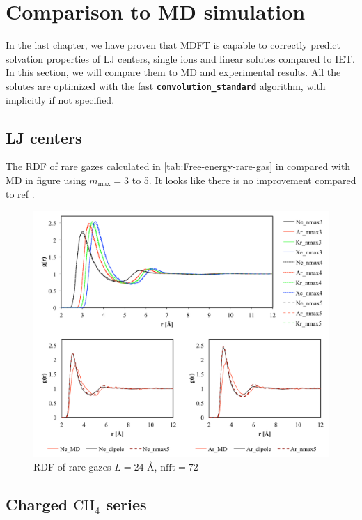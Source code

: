 
\chapter{Comparison to MD simulation\label{chpt:ions}}

In the last chapter, we have proven that \acs{MDFT} is capable to
correctly predict solvation properties of LJ centers, single ions
and linear solutes compared to \acs{IET}. In this section, we will
compare them to \acs{MD} and experimental results. All the solutes
are optimized with the fast \texttt{\textbf{convolution\_standard}}
algorithm, with implicitly if not specified.

\section{LJ centers}

The \acs{RDF} of rare gazes calculated in \ref{tab:Free-energy-rare-gas}
in compared with \acs{MD} in figure using $m_{\max}=3$ to 5. It
looks like there is no improvement compared to ref \citep{Zhao_2011}.

\begin{figure}[h]
\begin{centering}
\includegraphics[width=0.8\columnwidth]{_figure/results/rare_gaz}
\par\end{centering}
\caption{RDF of rare gazes $L=24$ $\textrm{Å}$, $\mathrm{nfft}=72$}
\end{figure}


\section{Charged $\mathrm{CH_{4}}$ series}


